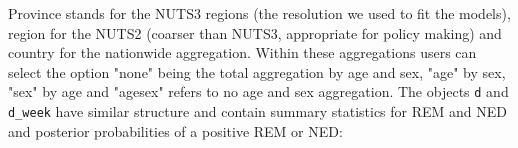 		
Province stands for the NUTS3 regions (the resolution we used to fit the models), region for the NUTS2 (coarser than NUTS3, appropriate for policy making) and country for the nationwide aggregation. Within these aggregations users can select the option "none" being the total aggregation by age and sex, "age" by sex, "sex" by age  and "agesex" refers to no age and sex aggregation. The objects \texttt{d} and \texttt{d\_week} have similar structure and contain summary statistics for REM and NED and posterior probabilities of a positive REM or NED: 
		
